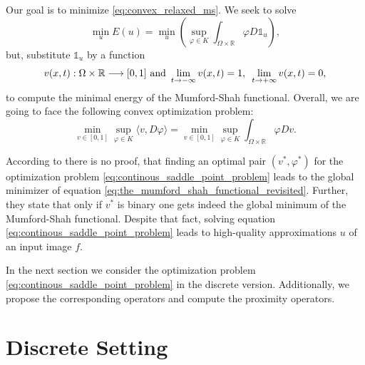 \documentclass{scrreprt}
\begin{document}
        Our goal is to minimize \ref{eq:convex_relaxed_ms}. We seek to solve
            $$
                \min_{u} E(u) = \min_{u} \left( \sup_{\varphi \in K} \int_{\Omega \times \mathbb{R}} \varphi D\mathds{1}_{u} \right),
            $$
        but, substitute $\mathds{1}_{u}$ by a function
            \begin{equation}
                v(x, t): \Omega \times \mathbb{R} \longrightarrow [0, 1] \,\, \textnormal{and} \,\, \lim_{t \rightarrow -\infty} v(x, t) = 1, \, \, \, \lim_{t \rightarrow +\infty} v(x, t) = 0,
            \label{eq:generic_functions}
            \end{equation}
        to compute the minimal energy of the Mumford-Shah functional. Overall, we are going to face the following convex optimization problem:
            \begin{equation}
                \min_{v \in [0, 1]} \sup_{\varphi \in K} \langle v, D\varphi \rangle = \min_{v \in [0, 1]} \sup_{\varphi \in K} \int_{\Omega \times \mathbb{R}} \varphi Dv.
                \label{eq:continous_saddle_point_problem}
            \end{equation}

        According to \cite{Pock-et-al-iccv09} there is no proof, that finding an optimal pair $(v^{\ast}, \varphi^{\ast})$ for the optimization problem \ref{eq:continous_saddle_point_problem} leads to the global minimizer of equation \ref{eq:the_mumford_shah_functional_revisited}. Further, they state that only if $v^{\ast}$ is binary one gets indeed the global minimum of the Mumford-Shah functional. Despite that fact, solving equation \ref{eq:continous_saddle_point_problem} leads to high-quality approximations $u$ of an input image $f$.

        In the next section we consider the optimization problem \ref{eq:continous_saddle_point_problem} in the discrete version. Additionally, we propose the corresponding operators and compute the proximity operators.


    \section{Discrete Setting} %
    \label{sec:discrete_setting_ms}
\end{document}
